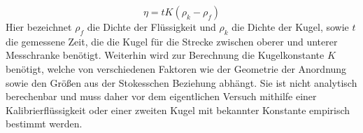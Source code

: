 \begin{equation}
    \label{eq:eta}
\eta = tK(\rho_k - \rho_f)
\end{equation}
Hier bezeichnet $\rho_f$ die Dichte der Flüssigkeit und $\rho_k$ die Dichte der Kugel, sowie $t$ die gemessene Zeit, die die Kugel für die Strecke zwischen oberer und unterer Messchranke benötigt. Weiterhin wird zur Berechnung die Kugelkonstante $K$ benötigt, welche von verschiedenen Faktoren wie der Geometrie der Anordnung sowie den Größen aus der Stokesschen Beziehung abhängt. Sie ist nicht analytisch berechenbar und muss daher vor dem eigentlichen Versuch mithilfe einer Kalibrierflüssigkeit oder einer zweiten Kugel mit bekannter Konstante empirisch bestimmt werden.
